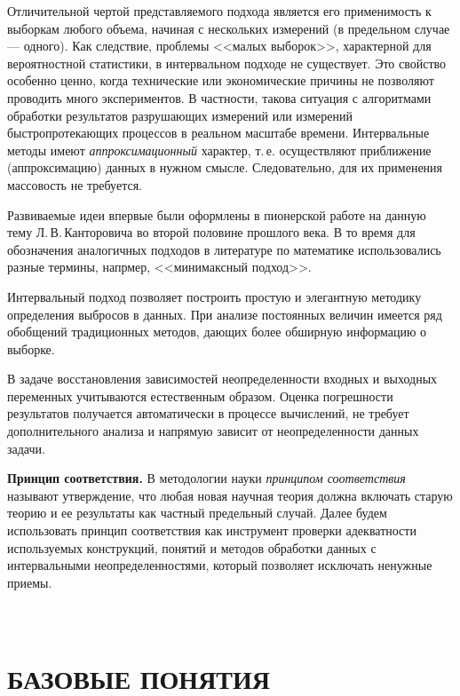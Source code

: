 \documentclass[a5paper,openany]{book}
\begin{document}
{Отличительной чертой представляемого подхода является его применимость 
к выборкам любого объема, начиная с нескольких измерений (в предельном случае --- 
одного). Как следствие, проблемы <<малых выборок>>, характерной для вероятностной 
статистики, в интервальном подходе не существует. Это свойство особенно 
ценно, когда технические или экономические причины не позволяют проводить 
много экспериментов. В частности, такова ситуация с алгоритмами обработки результатов 
разрушающих измерений или измерений быстропротекающих процессов в реальном масштабе 
времени. 
Интервальные методы имеют 
\emph{аппроксимационный} характер, т.\,е. осуществляют приближение (аппроксимацию) 
данных в нужном смысле. Следовательно, для их применения  массовость не требуется.   


Развиваемые идеи впервые были оформлены в пионерской работе на данную тему
Л.\,В.\,Канторовича \cite{Kantorovich} во второй половине прошлого века. 
В то время для обозначения  
аналогичных  подходов в литературе по математике использовались разные термины, напрмер,  <<минимаксный подход>>. 

Интервальный подход позволяет построить простую и 
элегантную методику определения выбросов в данных. 
При анализе постоянных величин  имеется ряд обобщений традиционных методов, дающих более обширную информацию о выборке. 

В задаче восстановления зависимостей 
неопределенности входных и выходных переменных учитываются естественным образом. 
Оценка погрешности результатов получается автоматически в процессе вычислений, не требует дополнительного анализа и напрямую зависит от неопределенности 
данных задачи. 

{\bf Принцип соответствия.} 
В методологии науки \textit{принципом соответствия} называют утверждение, что любая 
новая научная теория должна включать старую теорию и ее результаты как частный 
предельный случай. 	Далее будем использовать принцип соответствия как инструмент проверки адекватности используемых конструкций, понятий и методов обработки данных с интервальными 
неопределенностями, который позволяет исключать ненужные приемы.





	\chapter[Базовые понятия] %
{\\БАЗОВЫЕ ПОНЯТИЯ} %
\label{PrimaryConceptChap} 



}
\end{document}
